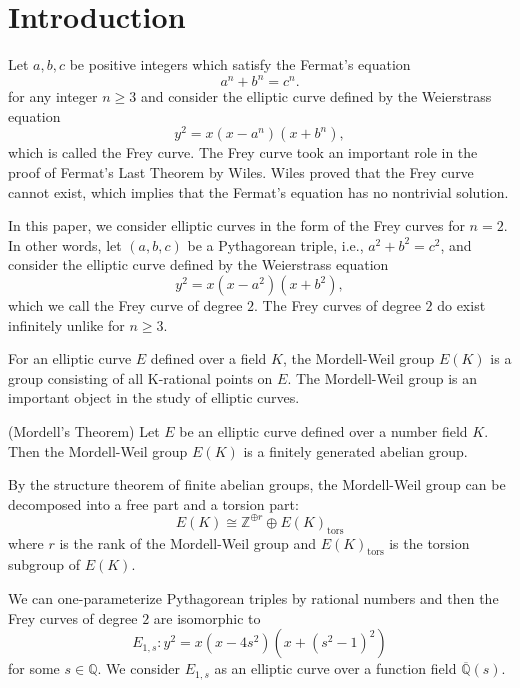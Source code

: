 \documentclass[main]{subfiles}
\begin{document}
\section{Introduction}

Let $a,b,c$ be positive integers which satisfy the Fermat's equation
\begin{equation*}
    a^{n} + b^{n} = c^{n}.
\end{equation*}
for any integer $n \geq 3$ and consider the elliptic curve defined by the Weierstrass equation
\begin{equation*}
    y^{2} = x(x - a^{n})(x + b^{n}),
\end{equation*}
which is called the Frey curve.
The Frey curve took an important role in the proof of Fermat's Last Theorem by Wiles.
Wiles proved that the Frey curve cannot exist, which implies that the Fermat's equation has no nontrivial solution.

In this paper, we consider elliptic curves in the form of the Frey curves for $n=2$.
In other words, let $(a,b,c)$ be a Pythagorean triple, i.e., $a^{2} + b^{2} = c^{2}$, and consider the elliptic curve defined by the Weierstrass equation
\begin{equation*}
    y^{2} = x(x - a^{2})(x + b^{2}),
\end{equation*}
which we call the Frey curve of degree $2$.
The Frey curves of degree $2$ do exist infinitely unlike for $n \geq 3$.

For an elliptic curve $E$ defined over a field $K$, the Mordell-Weil group $E(K)$ is a group consisting of all K-rational points on $E$.
The Mordell-Weil group is an important object in the study of elliptic curves.

\begin{thm}{(Mordell's Theorem)}
    \label{thm:mordell}
    Let $E$ be an elliptic curve defined over a number field $K$.
    Then the Mordell-Weil group $E(K)$ is a finitely generated abelian group.
\end{thm}
By the structure theorem of finite abelian groups, the Mordell-Weil group can be decomposed into a free part and a torsion part:
\begin{equation*}
    E(K) \cong \mathbb{Z}^{\oplus r} \oplus E(K)_{\text{tors}}
\end{equation*}
where $r$ is the rank of the Mordell-Weil group and $E(K)_{\text{tors}}$ is the torsion subgroup of $E(K)$.

We can one-parameterize Pythagorean triples by rational numbers and then the Frey curves of degree $2$ are isomorphic to
\begin{equation*}
    E_{1,s}: y^{2} = x(x - 4s^{2})(x + (s^{2} - 1)^{2})
\end{equation*}
for some $s \in \mathbb{Q}$.
We consider $E_{1,s}$ as an elliptic curve over a function field $\overline{\mathbb{Q}}(s)$.
\end{document}
